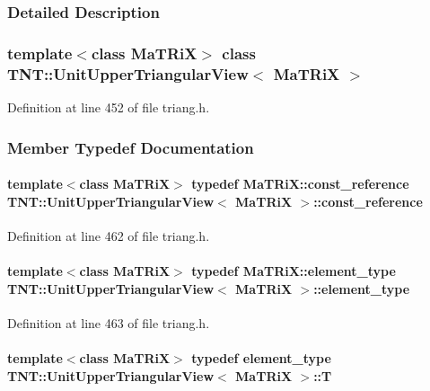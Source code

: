 \subsubsection{Detailed Description}
\subsubsection*{template$<$class MaTRiX$>$ class TNT::UnitUpperTriangularView$<$ MaTRiX $>$}



Definition at line 452 of file triang.h.



\subsubsection{Member Typedef Documentation}
\paragraph[{const\_\-reference}]{\setlength{\rightskip}{0pt plus 5cm}template$<$class MaTRiX$>$ typedef MaTRiX::const\_\-reference {\bf TNT::UnitUpperTriangularView}$<$ MaTRiX $>$::{\bf const\_\-reference}}\hfill\label{class_t_n_t_1_1_unit_upper_triangular_view_ac1baa9e5d305995a7ce8a10ee57e0fd6}


Definition at line 462 of file triang.h.

\paragraph[{element\_\-type}]{\setlength{\rightskip}{0pt plus 5cm}template$<$class MaTRiX$>$ typedef MaTRiX::element\_\-type {\bf TNT::UnitUpperTriangularView}$<$ MaTRiX $>$::{\bf element\_\-type}}\hfill\label{class_t_n_t_1_1_unit_upper_triangular_view_ade49853ca5425d55f180697c89ae914b}


Definition at line 463 of file triang.h.

\paragraph[{T}]{\setlength{\rightskip}{0pt plus 5cm}template$<$class MaTRiX$>$ typedef {\bf element\_\-type} {\bf TNT::UnitUpperTriangularView}$<$ MaTRiX $>$::{\bf T}}\hfill\label{class_t_n_t_1_1_unit_upper_triangular_view_a794aadc02accb0b9525c25e3d698e2c8}


